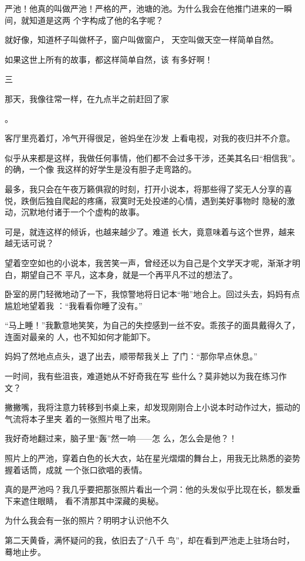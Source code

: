 \documentclass{article}
\begin{document}
严池！他真的叫做严池！严格的严，池塘的池。为什么我会在他推门进来的一瞬间，就知道是这两
个字构成了他的名字呢？ 

就好像，知道杯子叫做杯子，窗户叫做窗户，
天空叫做天空一样简单自然。 

如果这世上所有的故事，都这样简单自然，该
有多好啊！ 


三 

那天，我像往常一样，在九点半之前赶回了家
\newpage

。 

客厅里亮着灯，冷气开得很足，爸妈坐在沙发
上看电视，对我的夜归并不介意。 

似乎从来都是这样，我做任何事情，他们都不会过多干涉，还美其名曰“相信我”。的确，一个像
我这样的好学生是没有胆子走弯路的。 

最多，我只会在午夜万籁俱寂的时刻，打开小说本，将那些得了奖无人分享的喜悦，跌倒后独自爬起的疼痛，寂寞时无处投递的心情，遇到美好事物时
隐秘的激动，沉默地付诸于一个个虚构的故事。 

可是，就连这样的倾诉，也越来越少了。难道
长大，竟意味着与这个世界，越来越无话可说？ 

望着空空如也的小说本，我苦笑一声，曾经还以为自己是个文学天才呢，渐渐才明白，期望自己不
平凡，这本身，就是一个再平凡不过的想法了。 

\newpage

卧室的房门轻微地动了一下，我惊警地将日记本“啪”地合上。回过头去，妈妈有点尴尬地望着我
：“我看看你睡了没有。” 

“马上睡！”我歉意地笑笑，为自己的失控感到一丝不安。乖孩子的面具戴得久了，连面对最亲的
人，也不知如何才能卸下。 

妈妈了然地点点头，退了出去，顺带帮我关上
了门：“那你早点休息。” 

一时间，我有些沮丧，难道她从不好奇我在写
些什么？莫非她以为我在练习作文？ 

撇撇嘴，我将注意力转移到书桌上来，却发现刚刚合上小说本时动作过大，振动的气流将本子里夹
着的一张照片甩了出来。 

我好奇地翻过来，脑子里“轰”然一响——怎
么，怎么会是他？！ 

\newpage

照片上的严池，穿着白色的长大衣，站在星光熠熠的舞台上，用我无比熟悉的姿势握着话筒，成就
一个张口欲唱的表情。 

真的是严池吗？我几乎要把那张照片看出一个洞：他的头发似乎比现在长，额发垂下来遮住眼睛，
看不清那其中深藏的奥秘。 

为什么我会有一张的照片？明明才认识他不久

第二天黄昏，满怀疑问的我，依旧去了“八千
鸟”，却在看到严池走上驻场台时，蓦地止步。 
\end{document}

